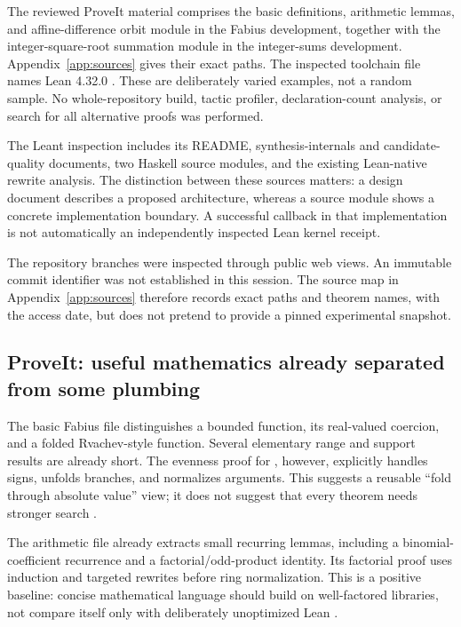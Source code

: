 \documentclass[11pt,a4paper]{article}
\newcommand{\code}[1]{\texttt{\detokenize{#1}}}
\theoremstyle{remark}
\begin{document}
The reviewed ProveIt material comprises the basic definitions, arithmetic lemmas, and affine-difference orbit module in the Fabius development, together with the integer-square-root summation module in the integer-sums development. Appendix~\ref{app:sources} gives their exact paths. The inspected toolchain file names Lean 4.32.0 \cite{proveit-toolchain}. These are deliberately varied examples, not a random sample. No whole-repository build, tactic profiler, declaration-count analysis, or search for all alternative proofs was performed.

The Leant inspection includes its README, synthesis-internals and candidate-quality documents, two Haskell source modules, and the existing Lean-native rewrite analysis. The distinction between these sources matters: a design document describes a proposed architecture, whereas a source module shows a concrete implementation boundary. A successful callback in that implementation is not automatically an independently inspected Lean kernel receipt.

The repository branches were inspected through public web views. An immutable commit identifier was not established in this session. The source map in Appendix~\ref{app:sources} therefore records exact paths and theorem names, with the access date, but does not pretend to provide a pinned experimental snapshot.

\subsection{ProveIt: useful mathematics already separated from some plumbing}

The basic Fabius file distinguishes a bounded function, its real-valued coercion, and a folded Rvachev-style function. Several elementary range and support results are already short. The evenness proof for \code{rvachevUp}, however, explicitly handles signs, unfolds branches, and normalizes arguments. This suggests a reusable ``fold through absolute value'' view; it does not suggest that every theorem needs stronger search \cite{proveit-basic}.

The arithmetic file already extracts small recurring lemmas, including a binomial-coefficient recurrence and a factorial/odd-product identity. Its factorial proof uses induction and targeted rewrites before ring normalization. This is a positive baseline: concise mathematical language should build on well-factored libraries, not compare itself only with deliberately unoptimized Lean \cite{proveit-arithmetic}.
\end{document}
